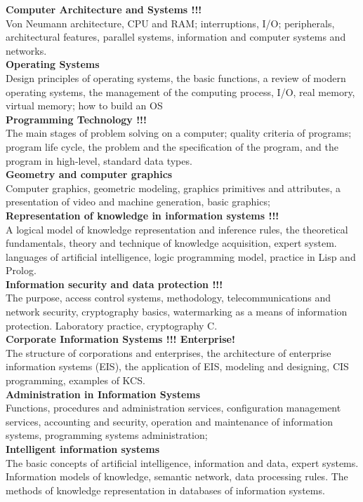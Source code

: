 \documentclass[a4paper, 12pt]{article}
\newcommand{\discipline}[1] {\textbf{#1} \\ }
\newcommand{\desc}[1] { #1 \\ }
\begin{document}
\discipline{Computer Architecture and Systems !!!}
\desc{Von Neumann architecture, CPU and RAM; interruptions, I/O; peripherals, architectural features, parallel systems, information and computer systems and networks.}

\discipline{Operating Systems}
\desc{Design principles of operating systems, the basic functions, a review of modern operating systems, the management of the computing process, I/O, real memory, virtual memory; how to build an OS}

\discipline{Programming Technology !!!}
\desc{The main stages of problem solving on a computer; quality criteria of programs; program life cycle, the problem and the specification of the program, and the program in high-level, standard data types.}

\discipline{Geometry and computer graphics}
\desc{Computer graphics, geometric modeling, graphics primitives and attributes, a presentation of video and machine generation, basic graphics;}

\discipline{Representation of knowledge in information systems !!!}
\desc{A logical model of knowledge representation and inference rules, the theoretical fundamentals, theory and technique of knowledge acquisition, expert system. languages ​​of artificial intelligence, logic programming model, practice in Lisp and Prolog.}

\discipline{Information security and data protection !!!}
\desc{The purpose, access control systems, methodology, telecommunications and network security, cryptography basics, watermarking as a means of information protection. Laboratory practice, cryptography C.}

\discipline{Corporate Information Systems !!! Enterprise!}
\desc{The structure of corporations and enterprises, the architecture of enterprise information systems (EIS), the application of EIS, modeling and designing, CIS programming, examples of KCS.}

\discipline{Administration in Information Systems}
\desc{Functions, procedures and administration services, configuration management services, accounting and security, operation and maintenance of information systems, programming systems administration;}

\discipline{Intelligent information systems}
\desc{The basic concepts of artificial intelligence, information and data, expert systems. Information models of knowledge, semantic network, data processing rules. The methods of knowledge representation in databases of information systems.}
\end{document}
